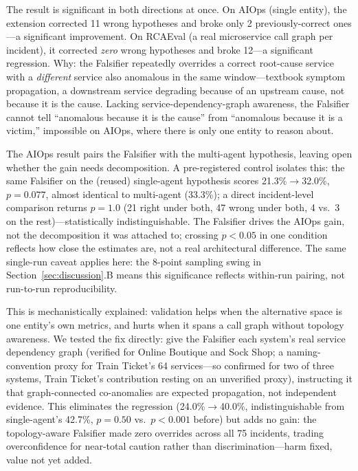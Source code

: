 \documentclass[10pt,conference]{IEEEtran}
\begin{document}
The result is significant in both directions at once. On AIOps (single
entity), the extension corrected 11 wrong hypotheses and broke only 2
previously-correct ones---a significant improvement. On RCAEval (a real
microservice call graph per incident), it corrected \emph{zero} wrong
hypotheses and broke 12---a significant regression. Why: the Falsifier
repeatedly overrides a correct root-cause service with a \emph{different}
service also anomalous in the same window---textbook symptom propagation,
a downstream service degrading because of an upstream cause, not because
it is the cause. Lacking service-dependency-graph awareness, the Falsifier
cannot tell ``anomalous because it is the cause'' from ``anomalous because
it is a victim,'' impossible on AIOps, where there is only one entity to
reason about.

The AIOps result pairs the Falsifier with the multi-agent hypothesis,
leaving open whether the gain needs decomposition. A pre-registered control
isolates this: the same Falsifier on the (reused) single-agent hypothesis
scores 21.3\%$\to$32.0\%, $p=0.077$, almost identical to multi-agent
(33.3\%); a direct incident-level comparison returns $p=1.0$ (21 right
under both, 47 wrong under both, 4 vs.\ 3 on the rest)---statistically
indistinguishable. The Falsifier drives the AIOps gain, not the
decomposition it was attached to; crossing $p<0.05$ in one condition
reflects how close the estimates are, not a real architectural
difference. The same single-run caveat applies here: the 8-point sampling
swing in Section~\ref{sec:discussion}.B means this significance reflects
within-run pairing, not run-to-run reproducibility.

This is mechanistically explained: validation helps when the alternative
space is one entity's own metrics, and hurts when it spans a call graph
without topology awareness. We tested the fix directly: give the Falsifier
each system's real service dependency graph (verified for Online Boutique
and Sock Shop; a naming-convention proxy for Train Ticket's 64
services---so confirmed for two of three systems, Train Ticket's
contribution resting on an unverified proxy), instructing it that graph-connected
co-anomalies are expected propagation, not independent evidence. This eliminates the regression
(24.0\%$\to$40.0\%, indistinguishable from single-agent's 42.7\%,
$p=0.50$ vs.\ $p<0.001$ before) but adds no gain: the topology-aware
Falsifier made zero overrides across all 75 incidents, trading
overconfidence for near-total caution rather than discrimination---harm
fixed, value not yet added.
\end{document}
